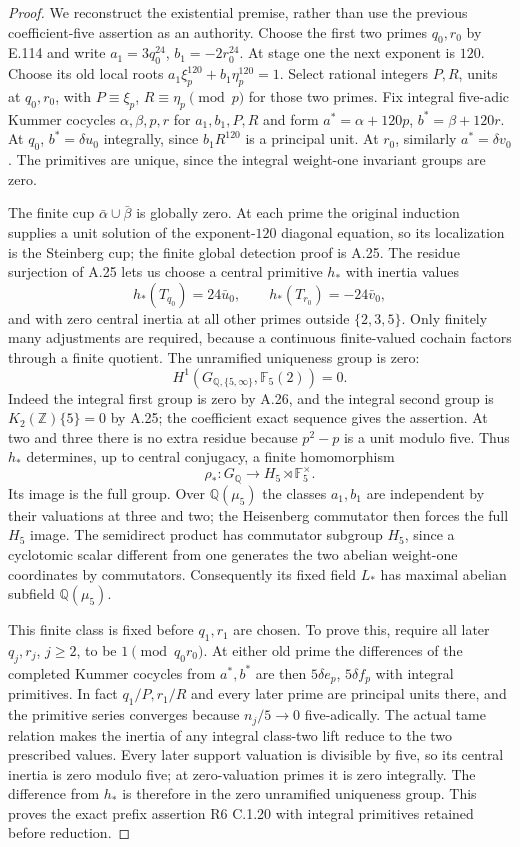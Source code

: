\begin{proof}
We reconstruct the existential premise, rather than use the previous
coefficient-five assertion as an authority. Choose the first two
primes $q_0,r_0$ by E.114 and write
$a_1=3q_0^{24}$, $b_1=-2r_0^{24}$. At stage one the next exponent
is $120$. Choose its old local roots
$a_1\xi_p^{120}+b_1\eta_p^{120}=1$. Select rational integers
$P,R$, units at $q_0,r_0$, with
$P\equiv\xi_p$, $R\equiv\eta_p\pmod p$ for those two primes.
Fix integral five-adic Kummer cocycles $\alpha,\beta,p,r$ for
$a_1,b_1,P,R$ and form $a^*=\alpha+120p$, $b^*=\beta+120r$.
At $q_0$, $b^*=\delta u_0$ integrally, since
$b_1R^{120}$ is a principal unit. At $r_0$, similarly
$a^*=\delta v_0$. The primitives are unique, since the integral
weight-one invariant groups are zero.

The finite cup $\bar\alpha\cup\bar\beta$ is globally zero.
At each prime the original induction supplies a unit solution of
the exponent-$120$ diagonal equation, so its localization is the
Steinberg cup; the finite global detection proof is A.25.
The residue surjection of A.25 lets us choose a central primitive
$h_*$ with inertia values
\[
 h_*(T_{q_0})=24\bar u_0,\qquad
 h_*(T_{r_0})=-24\bar v_0,
\]
and with zero central inertia at all other primes outside
$\{2,3,5\}$. Only finitely many adjustments are required, because
a continuous finite-valued cochain factors through a finite quotient.
The unramified uniqueness group is zero:
\[
 H^1(G_{\mathbb Q,\{5,\infty\}},\mathbb F_5(2))=0.
\]
Indeed the integral first group is zero by A.26, and the integral
second group is $K_2(\mathbb Z)\{5\}=0$ by A.25; the coefficient
exact sequence gives the assertion. At two and three there is no
extra residue because $p^2-p$ is a unit modulo five. Thus $h_*$
determines, up to central conjugacy, a finite homomorphism
\[
 \rho_*:G_{\mathbb Q}\longrightarrow H_5\rtimes\mathbb F_5^\times.
\]
Its image is the full group. Over $\mathbb Q(\mu_5)$ the classes
$a_1,b_1$ are independent by their valuations at three and two;
the Heisenberg commutator then forces the full $H_5$ image.
The semidirect product has commutator subgroup $H_5$, since a
cyclotomic scalar different from one generates the two abelian
weight-one coordinates by commutators. Consequently its fixed
field $L_*$ has maximal abelian subfield $\mathbb Q(\mu_5)$.

This finite class is fixed before $q_1,r_1$ are chosen. To prove
this, require all later $q_j,r_j$, $j\ge2$, to be $1\pmod{q_0r_0}$.
At either old prime the differences of the completed Kummer
cocycles from $a^*,b^*$ are then
$5\delta e_p$, $5\delta f_p$ with integral primitives.
In fact $q_1/P,r_1/R$ and every later prime are principal units
there, and the primitive series converges because $n_j/5\to0$
five-adically. The actual tame relation makes the inertia of any
integral class-two lift reduce to the two prescribed values.
Every later support valuation is divisible by five, so its central
inertia is zero modulo five; at zero-valuation primes it is zero
integrally. The difference from $h_*$ is therefore in the zero
unramified uniqueness group. This proves the exact prefix assertion
R6 C.1.20 with integral primitives retained before reduction.


\end{proof}
